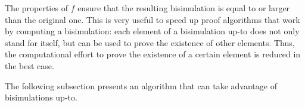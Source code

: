 The properties of $f$ ensure that the resulting bisimulation
is equal to or larger than the original one.
This is very useful to speed up proof algorithms that work by computing a bisimulation:
each element of a bisimulation up-to does not only stand for itself,
but can be used to prove the existence of other elements.
Thus, the computational effort to prove the existence of a certain element
is reduced in the best case.

The following subsection presents an algorithm that can take advantage of bisimulations up-to.

